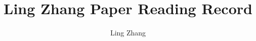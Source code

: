 \documentclass[letterpaper]{article}
\title{Ling Zhang Paper Reading Record}
\author{Ling Zhang}
\begin{document}
\maketitle


\nocite{*}
\printbibliography

%
\end{document}
